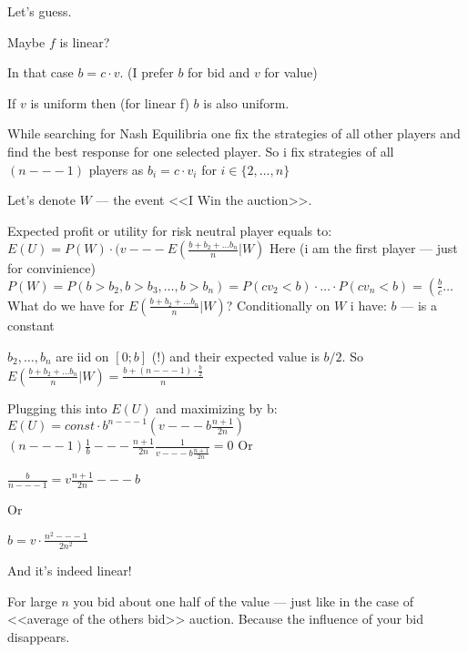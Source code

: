 \begin{solution}{5.23}

Let's guess.\par

Maybe $f$ is linear? \par
In that case $b = c\cdot v$. (I prefer $b$ for bid and $v$ for value) \par
If $v$ is uniform then (for linear f) $b$ is also uniform. \par

While searching for Nash Equilibria one fix the strategies of all other players and find the best response for one selected player. So i fix strategies of all $(n --- 1)$ players as $b_{i} = c\cdot v_{i}$ for $i\in\{2,\ldots,n\}$\par

Let's denote $W$ --- the event <<I Win the auction>>.\par

Expected profit or utility for risk neutral player equals to:
$E(U) = P(W)\cdot (v --- E(\frac {b + b_{2} + \ldots b_{n}}{n}|W)$
Here (i am the first player --- just for convinience)
$P(W) = P(b > b_{2}, b > b_{3}, \ldots, b > b_{n}) = P(cv_{2} < b)\cdot\ldots \cdot P(cv_{n} < b) = \left(\frac {b}{c}\right. \ldots$
What do we have for $E\left(\frac {b + b_{2} + \ldots b_{n}}{n}|W\right)$?
Conditionally on $W$ i have:
$b$ --- is a constant\par
$b_{2}, \ldots,b_{n}$ are iid on $[0;b]$ (!) and their expected value is $b/2$.
So $E\left(\frac {b + b_{2} + \ldots b_{n}}{n}|W\right) = \frac {b + (n --- 1)\cdot \frac {b}{2}}{n}$ \par

Plugging this into $E(U)$ and maximizing by b:
$E(U) = const\cdot b^{n --- 1}(v --- b\frac {n + 1}{2n})$
$(n --- 1)\frac {1}{b} --- \frac {n + 1}{2n}\frac {1}{v --- b\frac {n + 1}{2n}} = 0$
Or\par
$\frac {b}{n --- 1} = v\frac {n + 1}{2n} --- b$\par
Or\par
$b = v\cdot \frac {n^2 --- 1}{2n^{2}}$\par
And it's indeed linear!\par

For large $n$ you bid about one half of the value --- just like in the case of <<average of the others bid>> auction. Because the influence of your bid disappears.
\end{solution}
\begin{solution}{5.24}

\end{solution}
